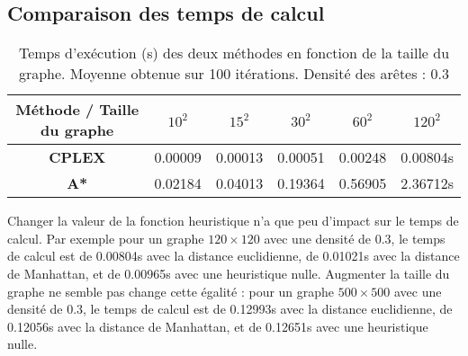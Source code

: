 \subsection{Comparaison des temps de calcul}
\begin{table}[H]
    \centering
    \begin{tabular}{|c|c|c|c|c|c|}
        \hline
        \textbf{Méthode / Taille du graphe} & $10^2$ & $15^2$ & $30^2$ & $60^2$ & $120^2$ \\
        \hline
        \textbf{CPLEX} & 0.00009 &  0.00013 & 0.00051 & 0.00248 & 0.00804s \\
        \hline
        \textbf{A*} & 0.02184 & 0.04013 & 0.19364 & 0.56905 & 2.36712s \\
        \hline
    \end{tabular}
    \caption{Temps d'exécution (s) des deux méthodes en fonction de la taille du graphe. Moyenne obtenue sur 100 itérations. Densité des arêtes : 0.3}
\end{table}

Changer la valeur de la fonction heuristique n'a que peu d'impact sur le temps de calcul. Par exemple pour un graphe $120 \times 120$ avec une densité de 0.3, le temps de calcul est de 0.00804s avec la distance euclidienne, de 0.01021s avec la distance de Manhattan, et de 0.00965s avec une heuristique nulle. Augmenter la taille du graphe ne semble pas change cette égalité : pour un graphe $500 \times 500$ avec une densité de 0.3, le temps de calcul est de 0.12993s avec la distance euclidienne, de 0.12056s avec la distance de Manhattan, et de 0.12651s avec une heuristique nulle.